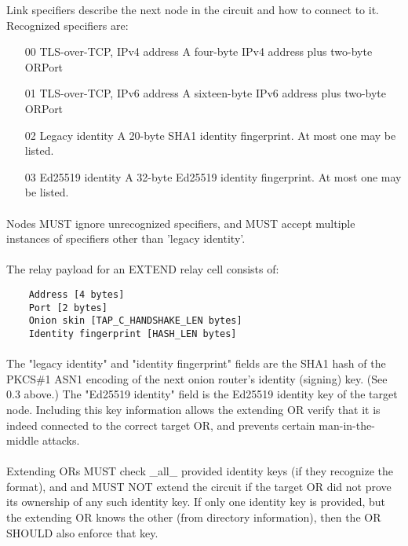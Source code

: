 Link specifiers describe the next node in the circuit and how to
connect to it. Recognized specifiers are:
\begin{itemize}
    \item [00] TLS-over-TCP, IPv4 address
    A four-byte IPv4 address plus two-byte ORPort
    \item [01] TLS-over-TCP, IPv6 address
    A sixteen-byte IPv6 address plus two-byte ORPort
    \item [02] Legacy identity
    A 20-byte SHA1 identity fingerprint. At most one may be listed.
    \item [03] Ed25519 identity
    A 32-byte Ed25519 identity fingerprint. At most one may
    be listed.
\end{itemize}

\paragraph{}
Nodes MUST ignore unrecognized specifiers, and MUST accept multiple
instances of specifiers other than 'legacy identity'.

\paragraph{}
The relay payload for an EXTEND relay cell consists of:
\begin{verbatim}
    Address [4 bytes]
    Port [2 bytes]
    Onion skin [TAP_C_HANDSHAKE_LEN bytes]
    Identity fingerprint [HASH_LEN bytes]
\end{verbatim}

\paragraph{}
The "legacy identity" and "identity fingerprint" fields are the
SHA1 hash of the PKCS\#1 ASN1 encoding of the next onion router's
identity (signing) key. (See 0.3 above.) The "Ed25519 identity"
field is the Ed25519 identity key of the target node. Including
this key information allows the extending OR verify that it is
indeed connected to the correct target OR, and prevents certain
man-in-the-middle attacks.

\paragraph{}
Extending ORs MUST check \_all\_ provided identity keys (if they
recognize the format), and and MUST NOT extend the circuit if the
target OR did not prove its ownership of any such identity key.
If only one identity key is provided, but the extending OR knows
the other (from directory information), then the OR SHOULD also
enforce that key.


